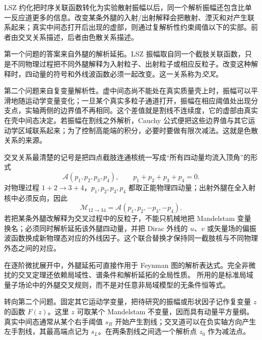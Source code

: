 LSZ 约化把时序关联函数转化为实验散射振幅以后，同一个解析振幅还包含比单一反应道更多的信息。改变某条外腿的入射/出射解释会把散射、湮灭和对产生联系起来；真实中间态打开后出现的虚部，则通过复解析性约束阈值以下的实部。前者由交叉关系描述，后者由色散关系描述。

第一个问题的答案来自外腿的解析延拓。LSZ 振幅取自同一个截肢关联函数，只是不同物理过程把不同外腿解释为入射粒子、出射粒子或相应反粒子。改变这种解释时，四动量的符号和外线波函数必须一起改变。这一关系称为\emph{交叉}。

第二个问题来自复变量解析性。虚中间态尚不能处在真实质量壳上时，振幅可以平滑地随运动学变量变化；一旦某个真实多粒子通道打开，振幅在相应阈值处出现分支点，实轴两侧的边界值不再相同。这个差值就是割线不连续度，它的虚部由真实在壳中间态决定。若振幅在割线之外解析，Cauchy 公式便把这些边界值与其它运动学区域联系起来；为了控制高能端的积分，必要时要做有限次减法。这就是色散关系的来源。

交叉关系最清楚的记号是把四点截肢连通核统一写成“所有四动量均流入顶角”的形式
\begin{equation}
 \mathcal A(p_1,p_2,p_3,p_4),
 \qquad
 p_1+p_2+p_3+p_4=0.
 \label{eq:all-incoming-amplitude-dp9}
\end{equation}
对物理过程 $1+2\to3+4$，$p_1,p_2,p_3,p_4$ 都取正能物理四动量；出射外腿在全入射核中必须反向，因此
\begin{equation}
 {
 \mathcal M_{12\to34}
 =\mathcal A(p_1,p_2,-p_3,-p_4).}
 \label{eq:physical-from-all-incoming-dp9}
\end{equation}
若把某条外腿改解释为交叉过程中的反粒子，不能只机械地把 Mandelstam 变量换名；必须同时解析延拓该外腿四动量，并把 Dirac 外线的 $u$、$v$ 或矢量场的偏振波函数换成新物理态对应的外线因子。这个联合替换才保持同一截肢核与不同物理外态之间的对应。

\begin{note}[交叉关系的使用范围]
在逐阶微扰展开中，外腿延拓可直接作用于 Feynman 图的解析表达式。完全非微扰的交叉定理还依赖局域性、谱条件和解析延拓的全局性质。 所用的是标准局域量子场论中的外腿交叉规则，而不是对任意非局域模型的无条件恒等式。
\end{note}

转向第二个问题。固定其它运动学变量，把待研究的振幅或形状因子记作复变量 $z$ 的函数 $F(z)$。这里 $z$ 可取某个 Mandelstam 不变量，因而具有动量平方量纲。真实中间态通常从某个右手阈值 $s_R$ 开始产生割线；交叉道可以在负实轴方向产生左手割线，其最高端点记为 $s_L$。在两条割线之间选一个解析点 $z_0$ 作为减法点。

